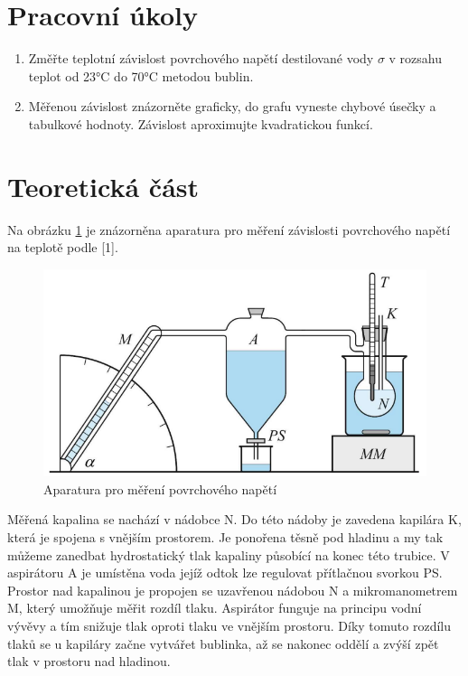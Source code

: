 \section{Pracovní úkoly}

\begin{enumerate}
\item Změřte teplotní závislost povrchového napětí destilované vody $\sigma$ v rozsahu teplot od 23°C do 70°C metodou bublin.

\item Měřenou závislost znázorněte graficky, do grafu vyneste chybové úsečky a tabulkové hodnoty. Závislost aproximujte kvadratickou funkcí.

\end{enumerate}

\section{Teoretická část}

Na obrázku \ref{fig:aparatura-povrchove-napeti} je znázorněna aparatura pro měření závislosti povrchového napětí na teplotě podle [1].

\begin{figure}[h]
    \centering
    \includegraphics[width=0.75\linewidth]{14 - Studium teplotní závislosti povrchového napětí//Protokol - studium povrchového napětí//img/Aparatura.png}
    \caption{Aparatura pro měření povrchového napětí}
    \label{fig:aparatura-povrchove-napeti}
\end{figure}

Měřená kapalina se nachází v nádobce N. Do této nádoby je zavedena kapilára K, která je spojena s vnějším prostorem. Je ponořena těsně pod hladinu a my tak můžeme zanedbat hydrostatický tlak kapaliny působící na konec této trubice. V aspirátoru A je umístěna voda jejíž odtok lze regulovat přítlačnou svorkou PS. Prostor nad kapalinou je propojen se uzavřenou nádobou N a mikromanometrem M, který umožňuje měřit rozdíl tlaku. Aspirátor funguje na principu vodní vývěvy a tím snižuje tlak oproti tlaku ve vnějším prostoru. Díky tomuto rozdílu tlaků se u kapiláry začne vytvářet bublinka, až se nakonec oddělí a zvýší zpět tlak v prostoru nad hladinou.


